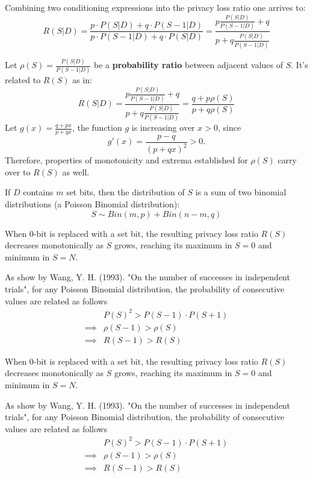 \documentclass[11pt]{article}
\begin{document}
Combining two conditioning expressions into the privacy loss ratio one arrives to:
\begin{equation} \label{eq:plratio}
R(S|D)=  \frac{p \cdot P(S | D ) + q \cdot P( S - 1 | D) } {  p  \cdot P(S -1 | D ) + q \cdot P( S  | D)  } = \frac{ p \frac{P(S | D )}{P(S - 1| D )} + q } { p + q \frac{P(S | D )}{P(S - 1| D )} }
\end{equation}

Let $\rho(S) = \frac{P(S | D )}{P(S - 1| D )}$ be a \textbf{probability ratio} between adjacent values of $S$.  It's related to $R(S)$ as in:
\begin{equation} \label{eq:plratio1}
R(S|D) =  \frac{ p \frac{P(S | D )}{P(S - 1| D )} + q } { p + q \frac{P(S | D )}{P(S - 1| D )} } = \frac{q + p\rho(S)}{p + q\rho(S)}
\end{equation}
Let $g(x) = \frac{q + px}{p + qx}$, the function $g$ is increasing over $x>0$, since
\[ g'(x) = \frac{p-q}{(p+qx)^2} > 0. \]
Therefore, properties of monotonicity and extrema established for $\rho(S)$  carry over to $R(S)$ as well.
 
 If  $D$ contains $m$ set bits, then the distribution of $S$ is a sum of two binomial distributions (a Poisson Binomial distribution): 
 \[ S  \sim Bin(m,p) + Bin(n-m,q) \]
 
 \begin{lem} \label{lem:rs1}
When 0-bit is replaced with a set bit, the resulting privacy loss ratio $R(S)$ decreases monotonically as $S$ grows, reaching its maximum in $S=0$ and minimum in $S=N$.
\end{lem}
\begin{pf}
 As show by Wang, Y. H. (1993). "On the number of successes in independent trials", for any Poisson Binomial distribution, the probability of consecutive values are related as follows
 \begin{align*}
 & P(S)^2  > P(S-1) \cdot P(S+1) \\
\implies &  \rho(S-1) > \rho(S) \\
\implies & R(S-1) > R(S)
\end{align*}
\end{pf}

 \begin{lem} \label{lem:rs1}
When 0-bit is replaced with a set bit, the resulting privacy loss ratio $R(S)$ decreases monotonically as $S$ grows, reaching its maximum in $S=0$ and minimum in $S=N$.
\end{lem}
\begin{pf}
 As show by Wang, Y. H. (1993). "On the number of successes in independent trials", for any Poisson Binomial distribution, the probability of consecutive values are related as follows
 \begin{align*}
 & P(S)^2  > P(S-1) \cdot P(S+1) \\
\implies &  \rho(S-1) > \rho(S) \\
\implies & R(S-1) > R(S)
\end{align*}
\end{pf}
\end{document}
